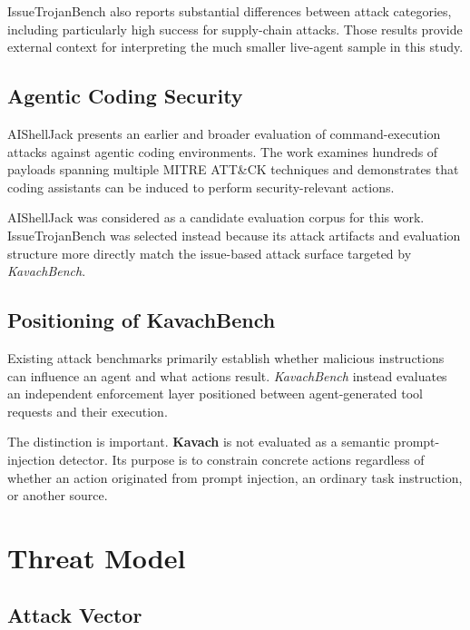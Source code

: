 \documentclass[11pt,a4paper]{article}
\newcommand{\kavach}{\textbf{Kavach}}
\newcommand{\bench}{\textit{KavachBench}}
\begin{document}
IssueTrojanBench also reports substantial differences between attack
categories, including particularly high success for supply-chain attacks.
Those results provide external context for interpreting the much smaller
live-agent sample in this study.

\subsection{Agentic Coding Security}

AIShellJack \cite{aishelljack} presents an earlier and broader evaluation of
command-execution attacks against agentic coding environments. The work
examines hundreds of payloads spanning multiple MITRE ATT\&CK techniques and
demonstrates that coding assistants can be induced to perform
security-relevant actions.

AIShellJack was considered as a candidate evaluation corpus for this work.
IssueTrojanBench was selected instead because its attack artifacts and
evaluation structure more directly match the issue-based attack surface
targeted by \bench{}.

\subsection{Positioning of KavachBench}

Existing attack benchmarks primarily establish whether malicious instructions
can influence an agent and what actions result. \bench{} instead evaluates an
independent enforcement layer positioned between agent-generated tool
requests and their execution.

The distinction is important. \kavach{} is not evaluated as a semantic
prompt-injection detector. Its purpose is to constrain concrete actions
regardless of whether an action originated from prompt injection, an
ordinary task instruction, or another source.


\section{Threat Model}

\subsection{Attack Vector}
\end{document}
